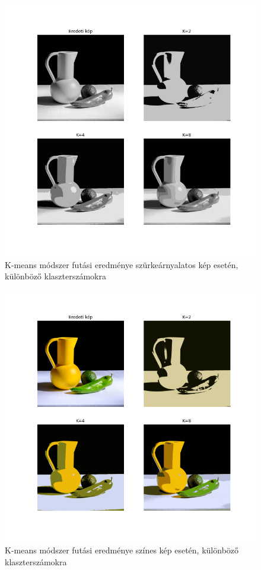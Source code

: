 \begin{figure}[h]
\centering
\includegraphics[scale=0.6]{images/kmeans_grayscale.png}
\caption{K-means módszer futási eredménye szürkeárnyalatos kép esetén, különböző klaszterszámokra}
\label{fig:kmenas_grayscale}
\end{figure}

\begin{figure}[h]
\centering
\includegraphics[scale=0.6]{images/kmeans_rgb.png}
\caption{K-means módszer futási eredménye színes kép esetén, különböző klaszterszámokra}
\label{fig:kmenas_rgb}
\end{figure}

